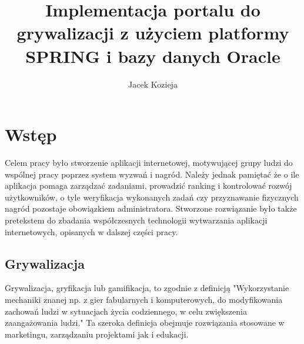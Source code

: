 \documentclass[a4paper,12pt,twoside,openany]{report}
\title{Implementacja portalu do grywalizacji z użyciem platformy SPRING i bazy danych Oracle}
\author{Jacek Kozieja}
\begin{document}
\maketitle
\chapter{Wstęp}
Celem pracy było stworzenie aplikacji internetowej, motywującej grupy ludzi do wspólnej pracy poprzez system wyzwań i nagród. Należy jednak pamiętać że o ile aplikacja pomaga zarządzać zadaniami, prowadzić ranking i kontrolować rozwój użytkowników, o tyle weryfikacja wykonanych zadań czy przyznawanie fizycznych nagród pozostaje obowiązkiem administratora. Stworzone rozwiązanie było także pretekstem do zbadania współczesnych technologii wytwarzania aplikacji internetowych, opisanych w dalszej części pracy.
\section{Grywalizacja}
	Grywalizacja, gryfikacja lub gamifikacja, to zgodnie z definicją \cite{Wikipedia} "Wykorzystanie mechaniki znanej np. z gier fabularnych i komputerowych, do modyfikowania zachowań ludzi w sytuacjach życia codziennego, w celu zwiększenia zaangażowania ludzi." Ta szeroka definicja obejmuje rozwiązania stosowane w marketingu, zarządzaniu projektami jak i edukacji.
\end{document}

